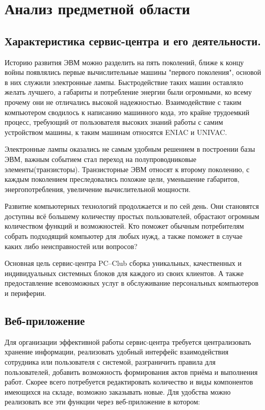 \section{Анализ предметной области}
\subsection{Характеристика сервис-центра и его деятельности.}

Историю развития ЭВМ можно разделить на пять поколений, ближе к концу войны появлялись первые вычислительные машины "первого поколения", основой в них служили электронные лампы. Быстродействие таких машин оставляло желать лучшего, а габариты и потребление энергии были огромными, ко всему прочему они не отличались высокой надежностью. Взаимодействие с таким компьютером сводилось к написанию машинного кода, это крайне трудоемкий процесс, требующий от пользователя высоких знаний работы с самим устройством машины, к таким машинам относятся ENIAC и UNIVAC.

Электронные лампы оказались не самым удобным решением в построении базы ЭВМ, важным событием стал переход на полупроводниковые элементы(транзисторы). Транзисторные ЭВМ относят к второму поколению, с каждым поколением преследовались похожие цели, уменьшение габаритов, энергопотребления, увеличение вычислительной мощности.

Развитие компьютерных технологий продолжается и по сей день. Они становятся доступны всё большему количеству простых пользователей, обрастают огромным количеством функций и возможностей. Кто поможет обычным потребителям собрать подходящий компьютер для любых нужд, а также поможет в случае каких либо неисправностей или вопросов?

Основная цель сервис-центра PC--Club сборка уникальных, качественных и индивидуальных системных блоков для каждого из своих клиентов. А также предоставление всевозможных услуг в обслуживание персональных компьютеров и периферии. 
\subsection{Веб-приложение}

Для организации эффективной работы сервис-центра требуется централизовать хранение информации, реализовать удобный интерфейс взаимодействия сотрудника или пользователя с системой, разграничить правила для пользователей, добавить возможность формирования актов приёма и выполнения работ. Скорее всего потребуется редактировать количество и виды компонентов имеющихся на складе, возможно заказывать новые. Для удобства можно реализовать все эти функции через веб-приложение в котором:

